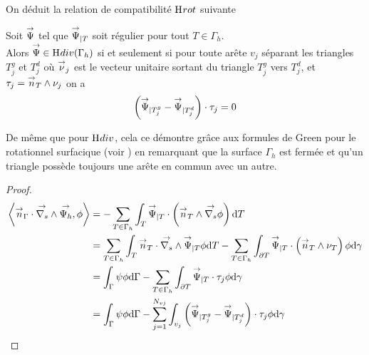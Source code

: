 On déduit la relation de compatibilité \(\mathrm{H}_\mathrm{{}}{rot}\) suivante
\begin{prop}
    \label{prop:annex:hdiv_hrot:hrot}
    Soit \({\overset{\rightarrow}{\Psi}}\) tel que \({\overset{\rightarrow}{\Psi}}_{|T}\) soit régulier pour tout \(T\in\Gamma_h\).\\
    Alors \({\overset{\rightarrow}{\Psi}} \in \mathrm{H}_\mathrm{{}}{div}(\Gamma_h)\) si et seulement si pour toute arête \(v_j\) séparant les triangles \(T_j^g\) et \(T_j^d\) où \({\overset{\rightarrow}{\nu}}_j\) est le vecteur unitaire sortant du triangle \(T_j^g\) vers \(T_j^d\), et \(\tau_j = {\overset{\rightarrow}{n}}_T \wedge \nu_j\) on a
    \begin{equation}
        \left({\overset{\rightarrow}{\Psi}}_{|T_j^g} - {\overset{\rightarrow}{\Psi}}_{|T_j^d} \right) \cdot \tau_j = 0
    \end{equation}
\end{prop}

De même que pour \(\mathrm{H}_\mathrm{{}}{div}\), cela ce démontre grâce aux formules de Green pour le rotationnel surfacique (voir \cite[eq.~(A3.57)]{bladel_electromagnetic_2007}) en remarquant que la surface \(\Gamma_h\) est fermée et qu'un triangle possède toujours une arête en commun avec un autre.

\begin{proof}
    \begin{align}
    \left< {\overset{\rightarrow}{n}}_\Gamma \cdot {\overset{\rightarrow}{\nabla_s}} \wedge {\overset{\rightarrow}{\Psi_h}}, \phi \right>
    & = - \sum_{T\in\Gamma_h} \int_T {\overset{\rightarrow}{\Psi}}_{|T}  \cdot \left( {\overset{\rightarrow}{n}}_T \wedge {\overset{\rightarrow}{\nabla_s}} \phi \right) \mathrm{d}{T} \\
    & = \sum_{T\in\Gamma_h} \int_T {\overset{\rightarrow}{n}}_T \cdot {\overset{\rightarrow}{\nabla_s}} \wedge {\overset{\rightarrow}{\Psi}}_{|T} \phi \mathrm{d}{T} - \sum_{T\in\Gamma_h} \int_{\partial T}  {\overset{\rightarrow}{\Psi}}_{|T} \cdot \left({\overset{\rightarrow}{n}}_T \wedge \nu_T \right)\phi\mathrm{d}{\gamma}\\
    & = \int_\Gamma \psi \phi \mathrm{d}{\Gamma} - \sum_{T\in\Gamma_h} \int_{\partial T}  {\overset{\rightarrow}{\Psi}}_{|T} \cdot \tau_j \phi\mathrm{d}{\gamma}\\
    &= \int_\Gamma \psi \phi \mathrm{d}{\Gamma} - \sum_{j=1}^{N_{vj}} \int_{v_j}  \left({\overset{\rightarrow}{\Psi}}_{|T_j^g} - {\overset{\rightarrow}{\Psi}}_{|T_j^d} \right) \cdot \tau_j \phi\mathrm{d}{\gamma}
    \end{align}
\end{proof}